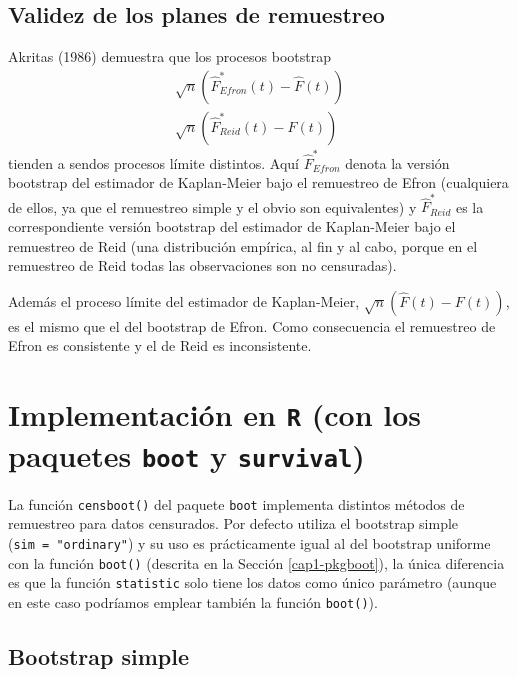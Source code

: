 \documentclass[]{book}
\theoremstyle{definition}
\theoremstyle{definition}
\theoremstyle{definition}
\theoremstyle{remark}
\begin{document}
\subsection{Validez de los planes de
remuestreo}\label{validez-de-los-planes-de-remuestreo}

Akritas (1986) demuestra que los procesos bootstrap \[\begin{aligned}
\sqrt{n}\left( \hat{F}^{\ast}_{Efron}\left( t \right) 
- \hat{F}\left( t \right) \right) \\ 
\sqrt{n}\left( \hat{F}^{\ast}_{Reid} \left( t \right) 
- \hat{F}\left( t \right) \right)
\end{aligned}\] tienden a sendos procesos límite distintos. Aquí
\(\hat{F}^{\ast}_{Efron}\) denota la versión bootstrap del estimador de
Kaplan-Meier bajo el remuestreo de Efron (cualquiera de ellos, ya que el
remuestreo simple y el obvio son equivalentes) y
\(\hat{F}^{\ast}_{Reid}\) es la correspondiente versión bootstrap del
estimador de Kaplan-Meier bajo el remuestreo de Reid (una distribución
empírica, al fin y al cabo, porque en el remuestreo de Reid todas las
observaciones son no censuradas).

Además el proceso límite del estimador de Kaplan-Meier,
\(\sqrt{n} \left( \hat{F}\left( t \right) -F\left( t \right) \right)\),
es el mismo que el del bootstrap de Efron. Como consecuencia el
remuestreo de Efron es consistente y el de Reid es inconsistente.

\section{\texorpdfstring{Implementación en \texttt{R} (con los paquetes
\texttt{boot} y
\texttt{survival})}{Implementación en R (con los paquetes boot y survival)}}\label{implementacion-en-r-con-los-paquetes-boot-y-survival}

La función \texttt{censboot()} del paquete \texttt{boot} implementa
distintos métodos de remuestreo para datos censurados. Por defecto
utiliza el bootstrap simple (\texttt{sim\ =\ "ordinary"}) y su uso es
prácticamente igual al del bootstrap uniforme con la función
\texttt{boot()} (descrita en la Sección \ref{cap1-pkgboot}), la única
diferencia es que la función \texttt{statistic} solo tiene los datos
como único parámetro (aunque en este caso podríamos emplear también la
función \texttt{boot()}).

\subsection{Bootstrap simple}\label{bootstrap-simple}
\end{document}
